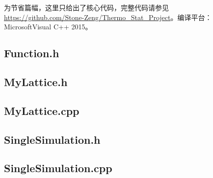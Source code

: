 \documentclass{article}
\begin{document}
		为节省篇幅，这里只给出了核心代码，完整代码请参见 \url{https://github.com/Stone-Zeng/Thermo_Stat_Project}。编译平台：Microsoft\textregistered\;Visual C++ 2015。
		{
		\linespread{1}
%		
		\subsection{Function.h}
		
		\subsection{MyLattice.h}
		
		\subsection{MyLattice.cpp}
		
%		
%		
		\subsection{SingleSimulation.h}
		
		\subsection{SingleSimulation.cpp}
		
%		
%		
		}
		
\end{document}
